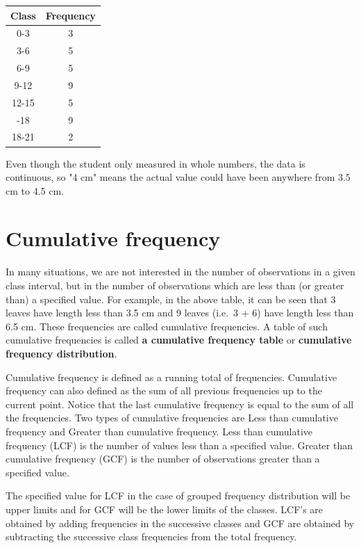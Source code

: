\documentclass[
]{book}
\begin{document}
\begin{table}[H]
\centering
\begin{tabular}[t]{cc}
\toprule
Class & Frequency\\
\midrule
0-3 & 3\\
3-6 & 5\\
6-9 & 5\\
9-12 & 9\\
12-15 & 5\\
\addlinespace
15-18 & 9\\
18-21 & 2\\
\bottomrule
\end{tabular}
\end{table}

Even though the student only measured in whole numbers, the data is continuous, so "4 cm" means the actual value could have been anywhere from 3.5 cm to 4.5 cm.

\hypertarget{cumulative-frequency}{%
\section{Cumulative frequency}\label{cumulative-frequency}}

In many situations, we are not interested in the number of observations in a given class interval, but in the number of observations which are less than (or greater than) a specified value. For example, in the above table, it can be seen that 3 leaves have length less than 3.5 cm and 9
leaves (i.e.~3 + 6) have length less than 6.5 cm. These frequencies are called cumulative frequencies. A table of such cumulative frequencies is called \textbf{a cumulative frequency table} or \textbf{cumulative frequency distribution}.

Cumulative frequency is defined as a running total of frequencies. Cumulative frequency can also defined as the sum of all previous frequencies up to the current point. Notice that the last cumulative frequency is equal to the sum of all the frequencies. Two types of cumulative frequencies are Less than cumulative frequency and Greater than cumulative frequency. Less than cumulative frequency
(LCF) is the number of values less than a specified value. Greater than cumulative frequency (GCF) is the number of observations greater than a specified value.

The specified value for LCF in the case of grouped frequency
distribution will be upper limits and for GCF will be the lower limits of the classes. LCF's are obtained by adding frequencies in the successive classes and GCF are obtained by subtracting the successive class frequencies from the total frequency.
\end{document}

